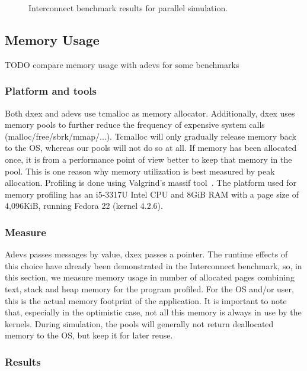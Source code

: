 \begin{figure}
    \caption{Interconnect benchmark results for parallel simulation.}
    \label{fig:interconnect_benchmark_parallel}
\end{figure}

\subsection{Memory Usage}
TODO compare memory usage with adevs for some benchmarks
\subsubsection{Platform and tools}
Both dxex and adevs use tcmalloc as memory allocator. Additionally, dxex uses memory pools to further reduce the frequency of expensive system calls (malloc/free/sbrk/mmap/...). Tcmalloc will only gradually release memory back to the OS, whereas our pools will not do so at all. If memory has been allocated once, it is from a performance point of view better to keep that memory in the pool. This is one reason why memory utilization is best measured by peak allocation. Profiling is done using Valgrind's massif tool~\cite{Nethercote:2007:VFH:1273442.1250746}.
The platform used for memory profiling has an i5-3317U Intel CPU and 8GiB RAM with a page size of 4,096KiB, running Fedora 22 (kernel 4.2.6).
\subsubsection{Measure}
Adevs passes messages by value, dxex passes a pointer. The runtime effects of this choice have already been demonstrated in the Interconnect benchmark, so, in this section, we measure memory usage in number of allocated pages combining text, stack and heap memory for the program profiled. For the OS and/or user, this is the actual memory footprint of the application. It is important to note that, especially in the optimistic case, not all this memory is always in use by the kernels. During simulation, the pools will generally not return deallocated memory to the OS, but keep it for later reuse.
\subsubsection{Results}
